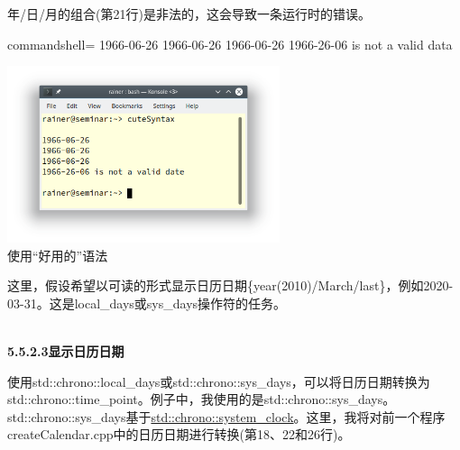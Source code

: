 年/日/月的组合(第21行)是非法的，这会导致一条运行时的错误。

\begin{tcblisting}{commandshell={}}
1966-06-26
1966-06-26
1966-06-26
1966-26-06 is not a valid data
\end{tcblisting}

\begin{center}
\includegraphics[width=0.6\textwidth]{content/3/chapter5/images/21.png}\\
使用“好用的”语法
\end{center}

这里，假设希望以可读的形式显示日历日期\{year(2010)/March/last\}，例如2020-03-31。这是local\_days或sys\_days操作符的任务。

\hspace*{\fill} \\ %
\noindent
\textbf{5.5.2.3\hspace{0.2cm}显示日历日期}

使用std::chrono::local\_days或std::chrono::sys\_days，可以将日历日期转换为std::chrono::time\_point。例子中，我使用的是std::chrono::sys\_days。std::chrono::sys\_days基于\href{https://en.cppreference.com/w/cpp/chrono/system_clock}{std::chrono::system\_clock}。这里，我将对前一个程序createCalendar.cpp中的日历日期进行转换(第18、22和26行)。

